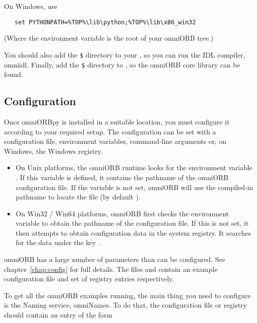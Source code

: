 \documentclass[11pt,oneside,a4paper]{book}
\begin{document}
On Windows, use

\begin{verbatim}
   set PYTHONPATH=%TOP%\lib\python;%TOP%\lib\x86_win32
\end{verbatim}

(Where the  environment variable is the root of your
omniORB tree.)

You should also add the \texttt{\$} directory
to your , so you can run the IDL compiler, omniidl.
Finally, add the \texttt{\$} directory to
, so the omniORB core library can be found.


\subsection{Configuration}

Once omniORBpy is installed in a suitable location, you must configure
it according to your required setup. The configuration can be set with
a configuration file, environment variables, command-line arguments
or, on Windows, the Windows registry.

\begin{itemize}

\item On Unix platforms, the omniORB runtime looks for the environment
  variable . If this variable is defined, it
  contains the pathname of the omniORB configuration file. If the
  variable is not set, omniORB will use the compiled-in pathname to
  locate the file (by default ).

\item On Win32 / Win64 platforms, omniORB first checks the environment
  variable  to obtain the pathname of the
  configuration file. If this is not set, it then attempts to obtain
  configuration data in the system registry. It searches for the data
  under the key .

\end{itemize}

omniORB has a large number of parameters than can be configured. See
chapter~\ref{chap:config} for full details. The files
 and  contain an example
configuration file and set of registry entries respectively.

To get all the omniORB examples running, the main thing you need to
configure is the Naming service, omniNames. To do that, the
configuration file or registry should contain an entry of the form
\end{document}
